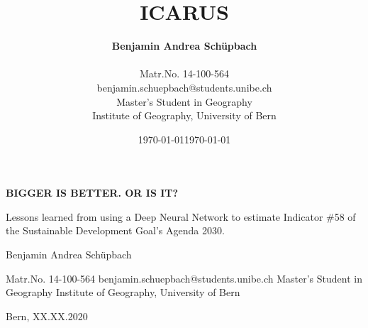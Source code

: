 


	\author{\textbf{Benjamin Andrea Schüpbach}\\ \\Matr.No. 14-100-564\\benjamin.schuepbach@students.unibe.ch\\Master's Student in Geography\\Institute of Geography, University of Bern\\}
	
	\date{\today}
	
	\title{\textbf{ICARUS\\}}
	\date{\today}
	
	

\clearpage
\thispagestyle{empty}

\begin{tcolorbox}[standard jigsaw, opacityback=0.5, width=620, center]
	
	\begin{center}
	{\Huge \textbf{BIGGER IS BETTER. OR IS IT?}}\bigbreak
	\end{center}

	\begin{center}
		{\Large Lessons learned from using a Deep Neural Network to estimate Indicator \#58 of the Sustainable Development Goal's Agenda 2030.}
	\end{center}


\end{tcolorbox}



\begin{tcolorbox}[width=200, halign=left]
	Benjamin Andrea Schüpbach \bigbreak
	
	Matr.No. 14-100-564\smallbreak
	benjamin.schuepbach@students.unibe.ch\smallbreak
	Master's Student in Geography\smallbreak
	Institute of Geography, University of Bern
\end{tcolorbox}




\bigbreak
\bigbreak
\bigbreak
\bigbreak
\bigbreak
\bigbreak


\begin{center}
	Bern, XX.XX.2020
	\end{center}



\newpage